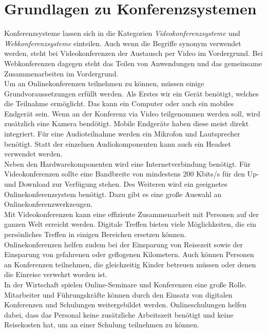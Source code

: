 \section{Grundlagen zu Konferenzsystemen}
Konferenzsysteme lassen sich in die Kategorien \textit{Videokonferenzsysteme} und \textit{Webkonferenzsysteme} einteilen.
\autocite[Vgl.][]{M_Straub.o.J.}
Auch wenn die Begriffe synonym verwendet werden, steht bei Videokonferenzen der Austausch per Video im Vordergrund.
Bei Webkonferenzen dagegen steht das Teilen von Anwendungen und das gemeinsame Zusammenarbeiten im Vordergrund.
\autocite[Vgl.][]{M_Straub.o.J.}
\\
Um an Onlinekonferenzen teilnehmen zu können, müssen einige Grundvoraussetzungen erfüllt werden.
Als Erstes wir ein Gerät benötigt, welches die Teilnahme ermöglicht.
Das kann ein Computer oder auch ein mobiles Endgerät sein.
Wenn an der Konferenz via Video teilgenommen werden soll, wird zusätzlich eine Kamera bendötigt.
Mobile Endgeräte haben diese meist direkt integriert.
Für eine Audioteilnahme werden ein Mikrofon und Lautsprecher benötigt.
Statt der einzelnen Audiokomponenten kann auch ein Headset verwendet werden.
\autocite[Vgl.][]{M_Straub.o.J.}
\\
Neben den Hardwarekomponenten wird eine Internetverbindung benötigt.
Für Videokonferenzen sollte eine Bandbreite von mindestens 200 Kbits/s für den Up- und Download zur Verfügung stehen.
Des Weiteren wird ein geeignetes Onlinekonferenzsystem benötigt.
Dazu gibt es eine große Auswahl an Onlinekonferenzwerkzeugen.
\autocite[Vgl.][]{M_Straub.o.J.}
\\
Mit Videokonferenzen kann eine effiziente Zusammenarbeit mit Personen auf der ganzen Welt erreicht werden.
Digitale Treffen bieten viele Möglichkeiten, die ein persönliches Treffen in einigen Bereichen ersetzen können.
\autocite[Vgl.][]{M_Mierke.2020}
\\
Onlinekonferenzen helfen zudem bei der Einsparung von Reisezeit sowie der Einsparung von gefahrenen oder geflogenen Kilometern.
Auch können Personen an Konferenzen teilnehmen, die gleichzeitig Kinder betreuen müssen oder denen die Einreise verwehrt worden ist.
\autocite[Vgl.][]{M_Sladek.2020}
\\
In der Wirtschaft spielen Online-Seminare und Konferenzen eine große Rolle.
Mitarbeiter und Führungskräfte können durch den Einsatz von digitalen Konferenzen und Schulungen weitergebildet werden.
Onlineschulungen helfen dabei, dass das Personal keine zusätzliche Arbeitszeit benötigt und keine Reisekosten hat, um an einer Schulung teilnehmen zu können.

